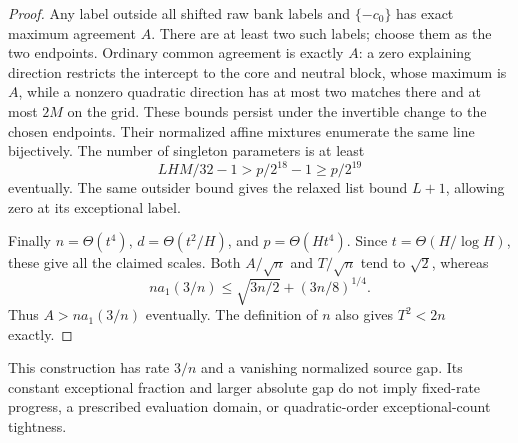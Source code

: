 \begin{proof}
Any label outside all shifted raw bank labels and $\{-c_0\}$ has
exact maximum agreement $A$.  There are at least two such labels;
choose them as the two endpoints.  Ordinary common agreement is
exactly $A$: a zero explaining direction restricts the intercept to
the core and neutral block, whose maximum is $A$, while a nonzero
quadratic direction has at most two matches there and at most $2M$
on the grid.  These bounds persist under the invertible change to
the chosen endpoints.  Their normalized affine mixtures enumerate
the same line bijectively.  The number of singleton parameters is at
least
\[
 LHM/32-1>p/2^{18}-1\ge p/2^{19}
\]
eventually.  The same outsider bound gives the relaxed list bound
$L+1$, allowing zero at its exceptional label.

Finally $n=\Theta(t^4)$, $d=\Theta(t^2/H)$, and
$p=\Theta(Ht^4)$.  Since $t=\Theta(H/\log H)$, these give all the
claimed scales.  Both $A/\sqrt n$ and $T/\sqrt n$ tend to $\sqrt2$, whereas
\[
 n a_1(3/n)\le\sqrt{3n/2}+(3n/8)^{1/4}.
\]
Thus $A>n a_1(3/n)$ eventually. The definition of $n$ also gives
$T^2<2n$ exactly.
\end{proof}

This construction has rate $3/n$ and a vanishing normalized source gap.
Its constant exceptional fraction and larger absolute gap do not imply
fixed-rate progress, a prescribed evaluation domain, or quadratic-order
exceptional-count tightness.
